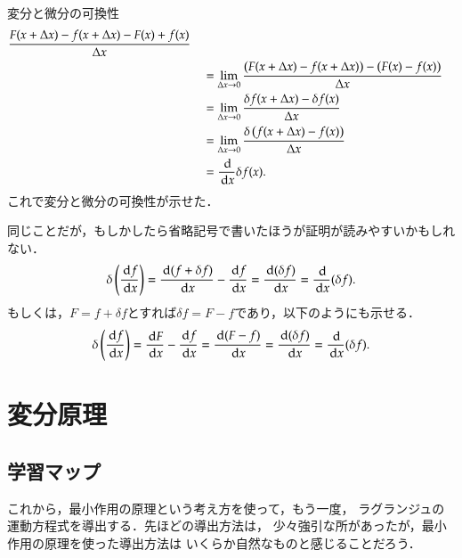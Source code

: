 \begin{memo}{変分と微分の可換性}
\begin{align*}
                                      \frac{F(x+\Delta x) - f(x+\Delta x) - F(x) +  f(x) }{\Delta x} \\
                            & \quad = \lim_{\Delta x \to 0}
                                      \frac{ \left( F(x+\Delta x) - f(x+\Delta x) \right)- \left( F(x) -  f(x) \right)}{\Delta x} \\
                            & \quad = \lim_{\Delta x \to 0}
                                      \frac{ \delta f(x+\Delta x) - \delta f(x)}{\Delta x} \\
                            & \quad = \lim_{\Delta x \to 0}
                                      \frac{ \delta \left( f(x+\Delta x) - f(x) \right)}{\Delta x} \\
                            & \quad = \frac{\,\mathrm{d}}{\,\mathrm{d} x}\delta f(x).
                \end{align*}
            これで変分と微分の可換性が示せた．

            同じことだが，もしかしたら省略記号で書いたほうが証明が読みやすいかもしれない．
                \[
                    \delta \left( \frac{\,\mathrm{d} f}{\,\mathrm{d} x} \right) = \frac{\,\mathrm{d} (f + \delta f)}{\,\mathrm{d} x} - \frac{\,\mathrm{d} f}{\,\mathrm{d} x} = \frac{\,\mathrm{d} (\delta f)}{\,\mathrm{d} x} = \frac{\,\mathrm{d} }{\,\mathrm{d} x} (\delta f).
                \]
            もしくは，$F=f+\delta f$とすれば$\delta f = F - f$であり，以下のようにも示せる．
                \[
                    \delta \left( \frac{\,\mathrm{d} f}{\,\mathrm{d} x} \right) = \frac{\,\mathrm{d} F}{\,\mathrm{d} x} - \frac{\,\mathrm{d} f}{\,\mathrm{d} x} = \frac{\,\mathrm{d} (F-f)}{\,\mathrm{d} x} = \frac{\,\mathrm{d} (\delta f)}{\,\mathrm{d} x} = \frac{\,\mathrm{d} }{\,\mathrm{d} x} (\delta f).
                \]
            
            

        \end{memo}

    \section{変分原理}
        \subsection{学習マップ}
            これから，最小作用の原理という考え方を使って，もう一度，
            ラグランジュの運動方程式を導出する．先ほどの導出方法は，
            少々強引な所があったが，最小作用の原理を使った導出方法は
            いくらか自然なものと感じることだろう．

